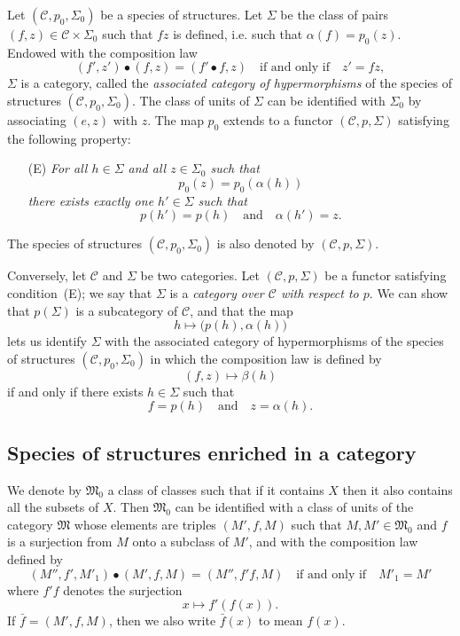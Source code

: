 \documentclass[fleqn]{article}
\newcommand{\oldpage}[1]{\marginpar{\footnotesize$\Big\vert$ \textit{p.~#1}}}
\newcommand{\CC}{\mathcal{C}}
\newcommand{\MM}{\mathfrak{M}}
\begin{document}
Let $(\CC,p_0,\Sigma_0)$ be a species of structures.
Let $\Sigma$ be the class of pairs $(f,z)\in\CC\times\Sigma_0$ such that $fz$ is defined, i.e. such that $\alpha(f)=p_0(z)$.
Endowed with the composition law
\[
  (f',z')\bullet(f,z)
  = (f'\bullet f,z)
  \quad\text{if and only if}\quad
  z'=fz,
\]
\oldpage{352}
$\Sigma$ is a category, called the \emph{associated category of hypermorphisms} of the species of structures $(\CC,p_0,\Sigma_0)$.
The class of units of $\Sigma$ can be identified with $\Sigma_0$ by associating $(e,z)$ with $z$.
The map $p_0$ extends to a functor $(\CC,p,\Sigma)$ satisfying the following property:
\begin{enumerate}
  \item[(E)] \itshape
    For all $h\in\Sigma$ and all $z\in\Sigma_0$ such that
    \[
      p_0(z)
      = p_0(\alpha(h))
    \]
    there exists exactly one $h'\in\Sigma$ such that
    \[
      p(h')=p(h)
      \quad\text{and}\quad
      \alpha(h')=z.
    \]
\end{enumerate}
The species of structures $(\CC,p_0,\Sigma_0)$ is also denoted by $(\CC,p,\Sigma)$.

Conversely, let $\CC$ and $\Sigma$ be two categories.
Let $(\CC,p,\Sigma)$ be a functor satisfying condition~(E);
we say that $\Sigma$ is a \emph{category over $\CC$ with respect to $p$}.
We can show \cite{3a} that $p(\Sigma)$ is a subcategory of $\CC$, and that the map
\[
  h\longmapsto \big(p(h),\alpha(h)\big)
\]
lets us identify $\Sigma$ with the associated category of hypermorphisms of the species of structures $(\CC,p_0,\Sigma_0)$ in which the composition law is defined by
\[
  (f,z) \longmapsto \beta(h)
\]
if and only if there exists $h\in\Sigma$ such that
\[
  f=p(h)
  \quad\text{and}\quad
  z=\alpha(h).
\]



\subsection{Species of structures enriched in a category}
\label{section:i.3}

We denote by $\MM_0$ a class of classes such that if it contains $X$ then it also contains all the subsets of $X$.
Then $\MM_0$ can be identified with a class of units of the category $\MM$ whose elements are triples $(M',f,M)$ such that $M,M'\in\MM_0$ and $f$ is a surjection from $M$ onto a subclass of $M'$, and with the composition law defined by
\[
  (M'',f',M'_1)\bullet(M',f,M)
  = (M'',f'f,M)
  \quad\text{if and only if}\quad
  M'_1=M'
\]
where $f'f$ denotes the surjection
\[
  x\longmapsto f'(f(x)).
\]
If $\bar{f}=(M',f,M)$, then we also write $\bar{f}(x)$ to mean $f(x)$.
\end{document}
